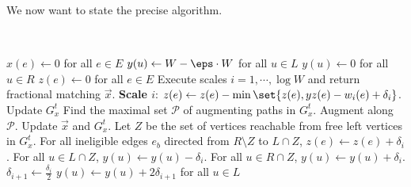 We now want to state the precise algorithm.
\begin{algorithm}[H] 
	\\
	\caption{\textsc{Weighted-Frac-Matching}($G,\kappa,\eps$)}
	\begin{algorithmic}[1]
		\State $x(e)\leftarrow 0$ for all $e\in E$ 
		\State $y(u)\leftarrow W-\eps\cdot W$ for all $u\in L$ 
		\State $y(u)\leftarrow 0$ for all $u\in R$ 
		\State $z(e)\leftarrow 0$ for all $e\in E$ 
	\EndProcedure
	\State Execute scales $i=1,\cdots, \log W$ and return fractional matching $\vec{x}$.
	\State \textbf{Scale $i$}:
		\State $z(e)\leftarrow z(e)-\min\set{z(e), yz(e)-w_i(e)+\delta_i}$.  \label{item:zadj} 
		\EndFor
		\State Update $G^t_x$
		\State Find the maximal set $\mathcal{P}$ of augmenting paths in $G^t_x$. \label{item:augpath}
		\State Augment along $\mathcal{P}$.  \label{item:augmentation}
		\State Update $\vec{x}$ and $G^t_x$.  \label{item:augmentation2}
		\EndProcedure
		\State Let $Z$ be the set of vertices reachable from free left vertices in $G^t_x$.
		\State For all ineligible edges $e_b$ directed from $R\setminus Z$ to $L\cap Z$, $z(e)\leftarrow z(e)+\delta_i$.
		\State For all $u\in L\cap Z$, $y(u)\leftarrow y(u)-\delta_i$.
		\State For all $u\in R\cap Z$, $y(u)\leftarrow y(u)+\delta_i$.
	\EndProcedure
		\EndWhile
		\State $\delta_{i+1}\leftarrow \frac{\delta_{i}}{2}$
		\State $y(u)\leftarrow y(u)+2\delta_{i+1}$ for all $u\in L$
	\EndProcedure
		\end{algorithmic}
	 \label{alg:weightedfracmatching}
\end{algorithm}